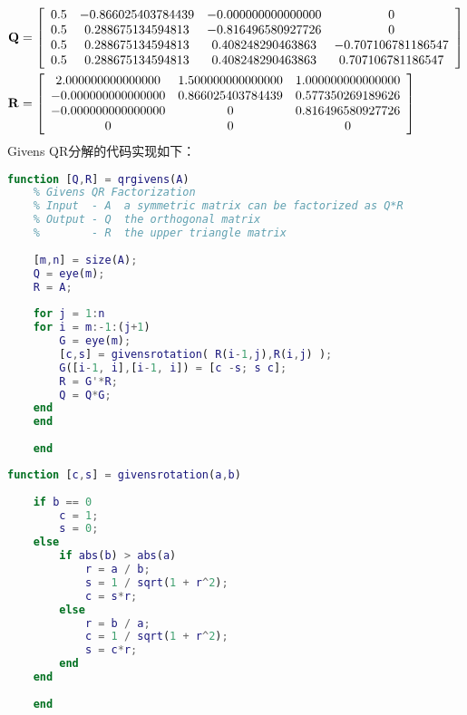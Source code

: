 \documentclass[UTF8]{ctexart}
\begin{document}
\begin{align}
\begin{aligned}
	\mathbf{Q} &=
	\left[\begin{array}{cccc}
	0.5 & -0.866025403784439 & -0.000000000000000 &                  0\\
	0.5 &  0.288675134594813 & -0.816496580927726 &                  0\\
	0.5 &  0.288675134594813 &  0.408248290463863 & -0.707106781186547\\
	0.5 &  0.288675134594813 &  0.408248290463863 &  0.707106781186547
	\end{array}\right] \notag\\
	\mathbf{R} &=
	\left[\begin{array}{cccc}
	2.000000000000000 & 1.500000000000000 &  1.000000000000000\\
	-0.000000000000000 &  0.866025403784439 &  0.577350269189626\\
	-0.000000000000000        &           0  & 0.816496580927726\\
	0                 &  0             &      0
	\end{array}\right] \notag
\end{aligned}
\end{align}
Givens QR分解的代码实现如下：
\begin{lstlisting}[language=matlab]
	function [Q,R] = qrgivens(A)
	% Givens QR Factorization
	% Input  - A  a symmetric matrix can be factorized as Q*R
	% Output - Q  the orthogonal matrix
	%        - R  the upper triangle matrix
	
	[m,n] = size(A);
	Q = eye(m);
	R = A;
	
	for j = 1:n
	for i = m:-1:(j+1)
		G = eye(m);
		[c,s] = givensrotation( R(i-1,j),R(i,j) );
		G([i-1, i],[i-1, i]) = [c -s; s c];
		R = G'*R;
		Q = Q*G;
	end
	end
	
	end
\end{lstlisting}
\begin{lstlisting}[language=matlab]
	function [c,s] = givensrotation(a,b)
	
	if b == 0
		c = 1;
		s = 0;
	else
		if abs(b) > abs(a)
			r = a / b;
			s = 1 / sqrt(1 + r^2);
			c = s*r;
		else
			r = b / a;
			c = 1 / sqrt(1 + r^2);
			s = c*r;
		end
	end
	
	end
\end{lstlisting}
\end{document}
